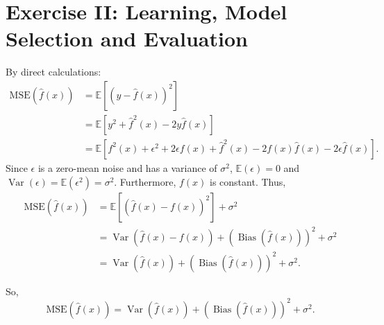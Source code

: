 \section{Exercise II: Learning, Model Selection and Evaluation}

By direct calculations:
\begin{align*}
    \text{MSE}(\hat{f}(x)) 
    &= \mathbb{E}[(y - \hat{f}(x))^2] \\
    &= \mathbb{E}[y^2 + \hat{f}^2(x) - 2y\hat{f}(x)] \\
    &= \mathbb{E}[f^2(x) + \epsilon^2 + 2\epsilon f(x) + \hat{f}^2(x) - 2f(x)\hat{f}(x) - 2\epsilon \hat{f}(x)].
\end{align*}
Since $\epsilon$ is a zero-mean noise and has a variance of $\sigma^2$, $\mathbb{E}(\epsilon) = 0$ and $\operatorname{Var}(\epsilon) = \mathbb{E}(\epsilon^2) = \sigma^2$. Furthermore, $f(x)$ is constant. Thus,
\begin{align*}
    \text{MSE}(\hat{f}(x)) 
    &= \mathbb{E}[(\hat{f}(x) - f(x))^2] + \sigma^2 \\
    &= \operatorname{Var}(\hat{f}(x) - f(x)) + (\operatorname{Bias}(\hat{f}(x)))^2 + \sigma^2 \\
    &= \operatorname{Var}(\hat{f}(x)) + (\operatorname{Bias}(\hat{f}(x)))^2 + \sigma^2.
\end{align*}

So, $$\boxed{\text{MSE}(\hat{f}(x)) = \operatorname{Var}(\hat{f}(x)) + (\operatorname{Bias}(\hat{f}(x)))^2 + \sigma^2.}$$